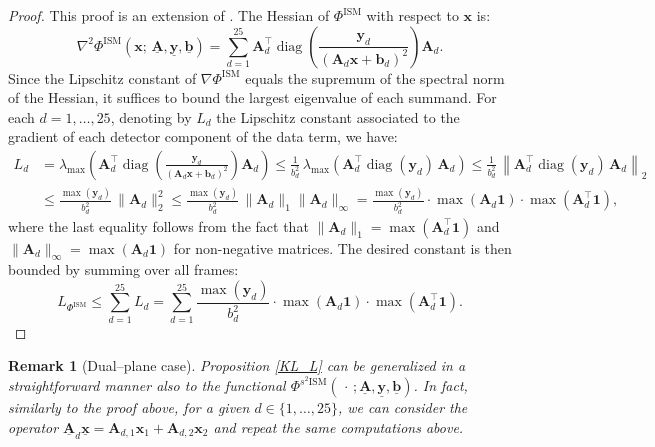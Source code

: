 \documentclass[letterpaper]{article}
\newcommand{\x}{\mathbf{x}}
\newcommand{\A}{\mathbf{A}}
\newtheorem{remark}{Remark}
\begin{document}
\begin{proof}
This proof is an extension of \cite[Lemma 1]{Harmany}.
The Hessian of $\Phi^{\text{ISM}}$ with respect to $\mathbf{x}$ is:
\begin{equation}
    \nabla^2 \Phi^{\text{ISM}}(\mathbf{x};\, \underline{\mathbf{A}}, \underline{\mathbf{y}}, 
    \underline{\mathbf{b}}) = \sum_{d=1}^{25} \mathbf{A}_d^\top \operatorname{diag}\!\left( 
    \frac{\mathbf{y}_d}{(\mathbf{A}_d \mathbf{x} + \mathbf{b}_d)^2} \right) \mathbf{A}_d.
\end{equation}
Since the Lipschitz constant of $\nabla \Phi^{\text{ISM}}$ equals the supremum of the spectral 
norm of the Hessian, it suffices to bound the largest eigenvalue of 
each summand. For each $d = 1, \dots, 25$, denoting by $L_d$ the Lipschitz constant associated to the gradient of each detector component of the data term, we have:
\begin{align*}
    L_d &= \lambda_{\max}\!\left( \mathbf{A}_d^\top \operatorname{diag}\!\left( 
    \frac{\mathbf{y}_d}{(\mathbf{A}_d \mathbf{x} + \mathbf{b}_d)^2} \right) 
    \mathbf{A}_d \right) \leq \frac{1}{b_d^2}\, \lambda_{\max}\!\left( \mathbf{A}_d^\top 
    \operatorname{diag}(\mathbf{y}_d)\, \mathbf{A}_d \right) \leq \frac{1}{b_d^2}\, \left\| \mathbf{A}_d^\top \operatorname{diag}(\mathbf{y}_d)\, 
    \mathbf{A}_d \right\|_2 \\
    &\leq \frac{\max(\mathbf{y}_d)}{b_d^2}\, \|\mathbf{A}_d\|_2^2 \leq \frac{\max(\mathbf{y}_d)}{b_d^2}\, \|\mathbf{A}_d\|_1 \|\mathbf{A}_d\|_\infty = \frac{\max(\mathbf{y}_d)}{b_d^2} \cdot \max(\mathbf{A}_d \mathbf{1}) \cdot \max(\mathbf{A}_d^\top \mathbf{1}),
\end{align*}
where the last equality follows from the fact that $\|\mathbf{A}_d\|_1 = 
\max(\mathbf{A}_d^\top \mathbf{1})$ and $\|\mathbf{A}_d\|_\infty = 
\max(\mathbf{A}_d \mathbf{1})$ for non-negative matrices. The desired constant 
is then bounded by summing over all frames:
\begin{equation}
    L_{\Phi^{\text{ISM}}} \leq \sum_{d=1}^{25} L_d = \sum_{d=1}^{25} 
    \frac{\max(\mathbf{y}_d)}{b_d^2} \cdot \max(\mathbf{A}_d \mathbf{1}) \cdot 
    \max(\mathbf{A}_d^\top \mathbf{1}). 
\end{equation}
\end{proof}

\begin{remark}[Dual--plane case]\label{rmk: lipschitz constant of KL in 2 planes ism}
    Proposition \ref{KL_L} can be generalized in a straightforward manner also to the functional $\Phi^{\text{$s^2$ISM}}(\,\cdot\,; \underline{\mathbf{A}}, \underline{\mathbf{y}}, 
\underline{\mathbf{b}})$.
In fact, similarly to the proof above, for a given $d \in \{1,\dots,25\}$, we can consider the operator $\underline{\A}_d\underline{\x} =  \A_{d,1}\x_1 + \A_{d,2}\x_2$ and repeat the same computations above.
\end{remark}
\end{document}
